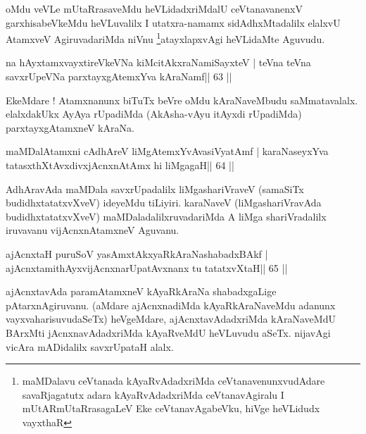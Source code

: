 \begin{artha}
oMdu veVLe mUtaRrasaveMdu heVLidadxriMdalU ceVtanavanenxV
garxhisabeVkeMdu heVLuvalilx I utatxra-namamx sidAdhxMtadalilx elalxvU
AtamxveV AgiruvadariMda niVnu \footnote{maMDalavu ceVtanada
kAyaRvAdadxriMda ceVtanavenunxvudAdare savaRjagatutx adara
kAyaRvAdadxriMda ceVtanavAgiralu I mUtARmUtaRrasagaLeV
Eke ceVtanavAgabeVku, hiVge heVLidudx vayxthaR}atayxlapxvAgi heVLidaMte
Aguvudu.
\end{artha}



\begin{shl}
na hAyxtamxvayxtireVkeVNa kiMcitAkxraNamiSayxteV |
teVna teVna savxrUpeVNa parxtayxgAtemxYva kAraNamf\hfill || 63 ||
\end{shl}

\begin{artha}
EkeMdare ! Atamxnanunx biTuTx beVre oMdu kAraNaveMbudu saMmatavalalx. elalxdakUkx AyAya rUpadiMda (AkAsha-vAyu itAyxdi rUpadiMda) parxtayxgAtamxneV kAraNa.
\end{artha}



\begin{shl}
maMDalAtamxni cA\s\s dhAreV liMgAtemxYvAvasiVyatAmf |
karaNaseyxYva tatasxthXtAvxdivxjAcnxnAtAmx hi liMgagaH\hfill || 64 ||
\end{shl}

\begin{artha}
AdhAravAda maMDala savxrUpadalilx liMgashariVraveV (samaSiTx
budidhxtatatxvXveV) ideyeMdu tiLiyiri. karaNaveV (liMgashariVravAda
budidhxtatatxvXveV) maMDaladalilxruvadariMda A liMga shariVradalilx
iruvavanu vijAcnxnAtamxneV Aguvanu.
\end{artha}



\begin{shl}
ajAcnxtaH puruSoV yasAmxtAkxyaRkAraNashabadxBAkf |
ajAcnxtamithAyxvijAcnxnarUpatAvxnanx tu tatatxvXtaH\hfill || 65 ||
\end{shl}

\begin{artha}
ajAcnxtavAda paramAtamxneV kAyaRkAraNa shabadxgaLige
pAtarxnAgiruvanu.  (aMdare ajAcnxnadiMda kAyaRkAraNaveMdu adanunx
vayxvaharisuvudaSeTx) heVgeMdare, ajAcnxtavAdadxriMda kAraNaveMdU BArxMti
jAcnxnavAdadxriMda kAyaRveMdU heVLuvudu aSeTx. nijavAgi vicAra
mADidalilx savxrUpataH alalx. 
\end{artha}
